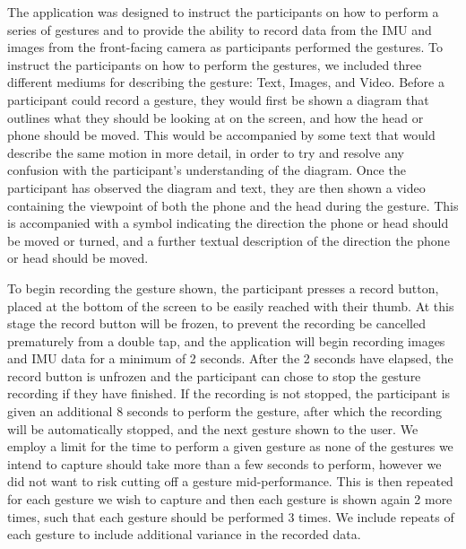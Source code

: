 The application was designed to instruct the participants on how to perform a series of gestures and to provide the ability to record data from the IMU and images from the front-facing camera as participants performed the gestures.
To instruct the participants on how to perform the gestures, we included three different mediums for describing the gesture: Text, Images, and Video.
Before a participant could record a gesture, they would first be shown a diagram that outlines what they should be looking at on the screen, and how the head or phone should be moved. This would be accompanied by some text that would describe the same motion in more detail, in order to try and resolve any confusion with the participant's understanding of the diagram.
Once the participant has observed the diagram and text, they are then shown a video containing the viewpoint of both the phone and the head during the gesture. This is accompanied with a symbol indicating the direction the phone or head should be moved or turned, and a further textual description of the direction the phone or head should be moved.

To begin recording the gesture shown, the participant presses a record button, placed at the bottom of the screen to be easily reached with their thumb. At this stage the record button will be frozen, to prevent the recording be cancelled prematurely from a double tap, and the application will begin recording images and IMU data for a minimum of 2 seconds. After the 2 seconds have elapsed, the record button is unfrozen and the participant can chose to stop the gesture recording if they have finished. If the recording is not stopped, the participant is given an additional 8 seconds to perform the gesture, after which the recording will be automatically stopped, and the next gesture shown to the user.
We employ a limit for the time to perform a given gesture as none of the gestures we intend to capture should take more than a few seconds to perform, however we did not want to risk cutting off a gesture mid-performance.
This is then repeated for each gesture we wish to capture and then each gesture is shown again 2 more times, such that each gesture should be performed 3 times. We include repeats of each gesture to include additional variance in the recorded data.

